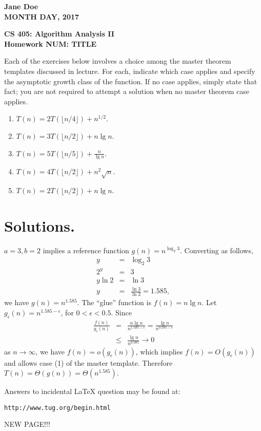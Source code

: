\documentclass{article}%
\begin{document}
\begin{flushright}
	\textbf{Jane Doe \\
		MONTH DAY, 2017}
\end{flushright}

\begin{center}
	\textbf{CS 405: Algorithm Analysis II \\
		Homework NUM: TITLE} \\
\end{center}

Each of the exercises below involves a choice among the master theorem templates discussed in lecture.
For each, indicate which case applies and specify the asymptotic growth class of the function.  If no
case applies, simply state that fact; you are not required to attempt a solution when no master theorem case
applies.

\begin{enumerate}
	\item $T(n) = 2 T(\lfloor n/4 \rfloor) + n^{1/2}$.
	\item $T(n) = 3 T(\lfloor n/2 \rfloor) + n \lg n$.
	\item $T(n) = 5 T(\lfloor n/5 \rfloor) + \frac{n}{\lg n}$.
	\item $T(n) = 4 T(\lfloor n/2 \rfloor) + n^2 \sqrt{n}$.
	\item $T(n) = 2 T(\lfloor n/2 \rfloor) + n \lg n$.
\end{enumerate}

\section*{Solutions.}
$a = 3, b = 2$ implies a reference function $g(n) = n^{\log_2 3}$. Converting as follows,
\begin{eqnarray*}
	y & = & \log_2 3 \\
	2^y & = & 3 \\
	y \ln 2 & = & \ln 3 \\
	y & = & \frac{\ln 3}{\ln 2} = 1.585,
\end{eqnarray*}
we have $g(n) = n^{1.585}$.  The ``glue'' function is $f(n) = n \lg n$.  Let $g_\epsilon (n) = n^{1.585 - \epsilon}$, for
$0 < \epsilon < 0.5$. Since
\begin{eqnarray*}
	\frac{f(n)}{g_\epsilon (n)} & = & \frac{n \lg n}{n^{1.585 - \epsilon}} = \frac{\lg n}{n^{0.585 - \epsilon}} \\
	& \leq & \frac{\lg n}{n^{0.085}} \rightarrow 0
\end{eqnarray*}
as $n \rightarrow \infty$, we have $f(n) = o(g_\epsilon (n))$, which implies $f(n) = O(g_\epsilon (n))$ and allows case (1) of the
master template.  Therefore $T(n) = \Theta(g(n)) = \Theta(n^{1.585})$.

\vspace*{0.5in}
\noindent Answers to incidental LaTeX question may be found at:
\begin{verbatim}
http://www.tug.org/begin.html
\end{verbatim}

\newpage
NEW PAGE!!!
\end{document}
